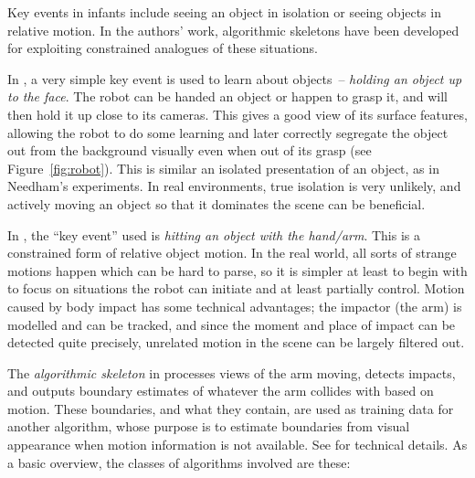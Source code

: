 Key events in infants include seeing an object in isolation
or seeing objects in relative motion.  In the authors' work,
 algorithmic skeletons have been developed for exploiting
constrained analogues of these situations.

%
In , a very simple key event is used to
learn about objects~-- {\em holding an object up to the face}.
%
The robot can be
 handed an object or happen to grasp it, 
and will then hold it up close to its cameras.
This gives a good view of its surface features, allowing the robot to
do some learning and later correctly segregate the object
out from the background  visually even when out of its
grasp (see Figure~\ref{fig:robot}).
%
%
This is similar an isolated presentation of an object, as in
Needham's experiments.  In real
environments, true isolation is very unlikely, and actively
moving an object so that it dominates the scene can be
beneficial.



%
%


In , the ``key event'' used is {\em
hitting an object with the hand/arm}.  This is a constrained form of
relative object motion.  In the real world, all sorts of strange
motions happen which can be hard to parse, so it is simpler at least
to begin with to focus on situations the robot can initiate and at
least partially control.
%
%
Motion caused by body impact has some technical advantages; the
impactor (the arm) is modelled and can be tracked, and since the moment 
and place of
impact can be detected quite precisely, unrelated motion in the scene
can be largely filtered out.

The {\em algorithmic skeleton} in \cite{fitzpatrick03grounding}
processes views of the arm moving, detects impacts, and
outputs boundary estimates of whatever the arm collides with based on
motion.  These boundaries, and what they contain, are used as training
data for another algorithm, whose purpose is to estimate boundaries
from visual appearance when motion information is not available.
%
%
See  for technical details.
As a basic overview, the classes of algorithms involved are these:


